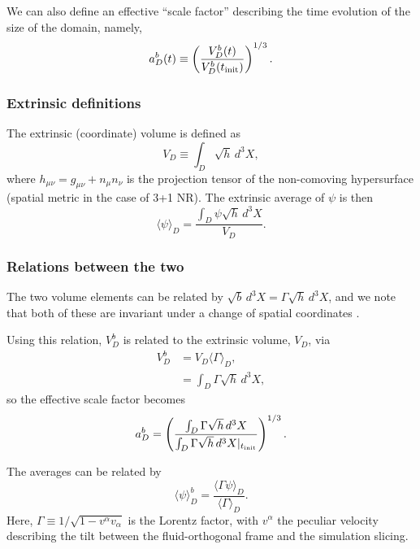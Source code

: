 \documentclass[a4paper]{article}
\newcommand{\alp}{\alpha}
\newcommand{\Gam}{\Gamma}
\begin{document}
We can also define an effective ``scale factor'' describing the time evolution of the size of the domain, namely,
\begin{equation}
	a_D^b(t) \equiv \left( \frac{V_D^b(t)}{V_D^b(t_{\rm init})} \right)^{1/3}.
\end{equation}


\subsubsection{Extrinsic definitions}

The extrinsic (coordinate) volume is defined as
\begin{equation}
	V_D \equiv \int_D \sqrt{h}\, d^3X,
\end{equation}
where $h_{\mu\nu}=g_{\mu\nu} + n_\mu n_\nu$ is the projection tensor of the non-comoving hypersurface (spatial metric in the case of 3+1 NR).
The extrinsic average of $\psi$ is then
\begin{equation} \label{eq:avgusual}
	\langle\psi\rangle_D = \frac{\int_D \psi \sqrt{h}\, d^3 X}{V_D}.
\end{equation}


\subsubsection{Relations between the two}

The two volume elements can be related by $\sqrt{b}\, d^3X = \Gam \sqrt{h}\, d^3X$, and we note that both of these are invariant under a change of spatial coordinates \citep[see p.35, footnote 15 in][]{buchert2019}.

Using this relation, $V_D^b$ is related to the extrinsic volume, $V_D$, via
\begin{align}
	V^b_D &= V_D \langle\Gam\rangle_D, \\
		   &= \int_D \Gam \sqrt{h} \,d^3X,
\end{align}
so the effective scale factor becomes
\begin{equation}
	a_D^b = \left( \frac{ \int_D \Gam \sqrt{h} \,d^3X } {\int_D \Gam \sqrt{h} \,d^3X |_{t_{\rm init}}} \right)^{1/3}.
\end{equation}

The averages can be related by
\begin{equation} \label{eq:avgrelation}
	\langle\psi\rangle^b_D = \frac{\langle\Gam\psi\rangle_D}{\langle\Gam\rangle_D}.
\end{equation}
Here, $\Gam \equiv 1/ \sqrt{1-v^\alp v_\alp}$ is the Lorentz factor, with $v^\alp$ the peculiar velocity describing the tilt between the fluid-orthogonal frame and the simulation slicing.
\end{document}
